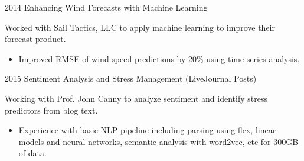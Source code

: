 \documentclass[]{friggeri-cv} %
\begin{document}
\begin{entrylist}
\entry
{2014}
{Enhancing Wind Forecasts with Machine Learning}
{}
{Worked with Sail Tactics, LLC to apply machine learning to improve their forecast product.\begin{itemize}
\item Improved RMSE of wind speed predictions by 20\% using time series analysis.
\end{itemize}
}
\entry
{2015}
{Sentiment Analysis and Stress Management (LiveJournal Posts)}
{}
{Working with Prof. John Canny to analyze sentiment and identify stress predictors from blog text.
\begin{itemize}
\item Experience with basic NLP pipeline including parsing using flex, linear models and neural networks, semantic analysis with word2vec, etc for 300GB of data. 
\end{itemize}
}
\end{entrylist}

%

\end{document}
